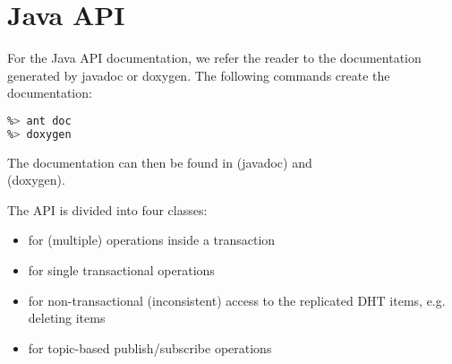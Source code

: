 \chapter{Java API}

For the Java API documentation, we refer the reader to the documentation
generated by javadoc or doxygen. The following commands create the
documentation:

\begin{lstlisting}[language=sh]
%> cd java-api
%> ant doc
%> doxygen
\end{lstlisting}

The documentation can then be found in 
(javadoc) and\\  (doxygen).

The API is divided into four classes:

\begin{itemize}
\item {} for (multiple) operations inside a
       transaction
\item {} for single transactional
       operations
\item {} for non-transactional (inconsistent)
       access to the replicated DHT items, e.g. deleting items
\item {} for topic-based publish/subscribe
       operations
\end{itemize}
